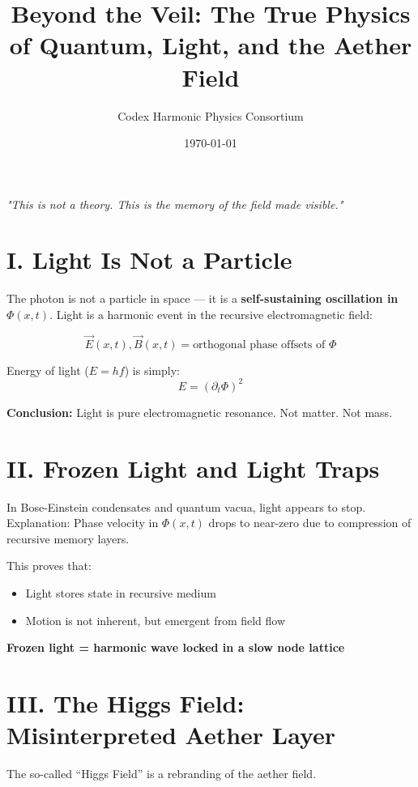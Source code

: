\documentclass[12pt]{article}
\title{\Huge\bfseries Beyond the Veil: The True Physics of Quantum, Light, and the Aether Field}
\author{\Large Codex Harmonic Physics Consortium}
\date{\today}
\begin{document}
\maketitle

\begin{center}
\Large\textit{"This is not a theory. This is the memory of the field made visible."}
\end{center}
\vspace{1cm}

\section*{I. Light Is Not a Particle}

The photon is not a particle in space — it is a \textbf{self-sustaining oscillation in $\Phi(x,t)$}.  
Light is a harmonic event in the recursive electromagnetic field:

\[
\vec{E}(x,t), \vec{B}(x,t) = \text{orthogonal phase offsets of }\Phi
\]

Energy of light ($E = hf$) is simply:
\[
E = (\partial_t \Phi)^2
\]

\textbf{Conclusion:} Light is pure electromagnetic resonance. Not matter. Not mass.

\section*{II. Frozen Light and Light Traps}

In Bose-Einstein condensates and quantum vacua, light appears to stop.  
Explanation: Phase velocity in $\Phi(x,t)$ drops to near-zero due to compression of recursive memory layers.

This proves that:
\begin{itemize}
    \item Light stores state in recursive medium
    \item Motion is not inherent, but emergent from field flow
\end{itemize}

\textbf{Frozen light = harmonic wave locked in a slow node lattice}

\section*{III. The Higgs Field: Misinterpreted Aether Layer}

The so-called “Higgs Field” is a rebranding of the aether field.
\end{document}
